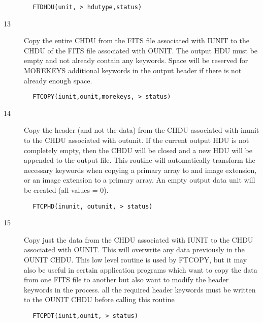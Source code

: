 \documentclass[11pt]{book}
\begin{document}
\begin{verbatim}
        FTDHDU(unit, > hdutype,status)
\end{verbatim}

\begin{description}
\item[13] Copy the entire CHDU from the FITS file associated with IUNIT to the CHDU
    of the FITS file associated with OUNIT. The output HDU must be empty and
    not already contain any keywords.  Space will be reserved for MOREKEYS
    additional  keywords in the output header if there is not already enough
   space.
\end{description}

\begin{verbatim}
        FTCOPY(iunit,ounit,morekeys, > status)
\end{verbatim}

\begin{description}
\item[14] Copy the header (and not the data) from the CHDU associated with inunit
    to the CHDU associated with outunit.  If the current output HDU
    is not completely empty, then the CHDU will be closed and a new
    HDU will be appended to the output file.  This routine will automatically
    transform the necessary keywords when copying a primary array to
    and image extension, or an image extension to a primary array.
   An empty output data unit will be created (all values = 0).
\end{description}

\begin{verbatim}
        FTCPHD(inunit, outunit, > status)
\end{verbatim}

\begin{description}
\item[15] Copy just the data from the CHDU associated with IUNIT
    to the CHDU associated with OUNIT. This will overwrite
    any data previously in the OUNIT CHDU.  This low level routine is used
    by FTCOPY, but it may also be useful in certain application programs
    which want to copy the data from one FITS file to another but also
    want to modify the header keywords in the process. all the required
    header keywords must be written to the OUNIT CHDU before calling
   this routine
\end{description}

\begin{verbatim}
        FTCPDT(iunit,ounit, > status)
\end{verbatim}

\end{document}
